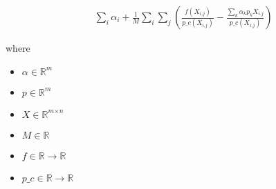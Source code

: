 \documentclass[12pt]{article}
\begin{document}
\begin{align*}
 & \sum_\textit{i} \textit{α}_{ \textit{i} } + \frac{1}{\textit{M}}\sum_\textit{i} \sum_\textit{j} \left( \frac{\textit{f}\left( \textit{X}_{\textit{i}, \textit{j}} \right)}{\textit{p\_c}\left( \textit{X}_{\textit{i}, \textit{j}} \right)} - \frac{\sum_\textit{k} \textit{α}_{ \textit{k} }\textit{p}_{ \textit{k} }\textit{X}_{\textit{i}, \textit{j}}}{\textit{p\_c}\left( \textit{X}_{\textit{i}, \textit{j}} \right)} \right)
\end{align*}

where
\begin{itemize}
\item $\textit{α} \in \mathbb{R}^{ \textit{m}}$
\item $\textit{p} \in \mathbb{R}^{ \textit{m}}$
\item $\textit{X} \in \mathbb{R}^{ \textit{m} \times \textit{n} }$
\item $\textit{M} \in \mathbb{{R}}$
\item $\textit{f} \in \mathbb{{R}}\rightarrow \mathbb{{R}}$
\item $\textit{p\_c} \in \mathbb{{R}}\rightarrow \mathbb{{R}}$
\end{itemize}
\end{document}

